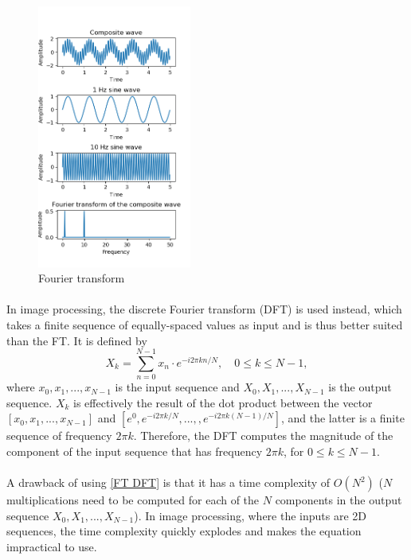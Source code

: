 \documentclass[12pt, twocolumn]{report}
\begin{document}
\begin{figure}[htbp]
    \centering
    \includegraphics[width=0.45\textwidth]{Figures/FT demonstration.png}
    \caption{Fourier transform}
    \label{FT demonstration}
\end{figure}

\paragraph{}
In image processing, the discrete Fourier transform (DFT) is used instead, which takes a finite sequence of equally-spaced values as input and is thus better suited than the FT. It is defined by
\begin{equation}
    X_k = \sum_{n=0}^{N-1} x_n \cdot e^{-i2\pi kn/N}, \quad 0 \leq k \leq N-1,
    \label{FT DFT}
\end{equation}
where $x_0,x_1,...,x_{N-1}$ is the input sequence and $X_0,X_1,...,X_{N-1}$ is the output sequence. $X_k$ is effectively the result of the dot product between the vector $[x_0,x_1,...,x_{N-1}]$ and $[e^0,e^{-i2\pi k/N},...,,e^{-i2\pi k(N-1)/N}]$, and the latter is a finite sequence of frequency $2\pi k$. Therefore, the DFT computes the magnitude of the component of the input sequence that has frequency $2\pi k$, for $0 \leq k \leq N-1$.

\paragraph{}
A drawback of using \eqref{FT DFT} is that it has a time complexity of $O(N^2)$ ($N$ multiplications need to be computed for each of the $N$ components in the output sequence $X_0,X_1,...,X_{N-1}$). In image processing, where the inputs are 2D sequences, the time complexity quickly explodes and makes the equation impractical to use. 
\end{document}
